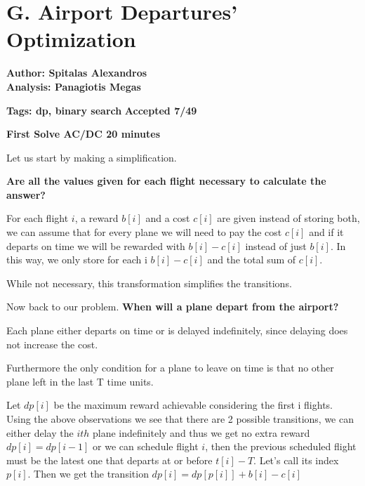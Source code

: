 \documentclass{article}
\begin{document}
    \vspace{5em}

    \newpage
    \vspace{5em}
    
\section*{G. Airport Departures' Optimization}

\textbf{Author: Spitalas Alexandros}\\
\textbf{Analysis: Panagiotis Megas}

\vspace{2em}
\noindent \textbf{Tags: dp, binary search} 
\hfill \textbf{Accepted 7/49}

\hfill \textbf{First Solve AC/DC 20 minutes}

\vspace{2em}

\noindent Let us start by making a simplification.

\noindent \textbf{Are all the values given for each flight necessary to calculate the answer?}

\noindent For each flight $i$, a reward $b[i]$ and a cost $c[i]$ are given instead of storing both, we can assume that for every plane we will need to pay the cost $c[i]$ and if it departs on time we will be rewarded with $b[i]-c[i]$ instead of just $b[i]$. In this way, we only store for each i $b[i]-c[i]$ and the total sum of $c[i]$.

\vspace{1em}

\noindent While not necessary, this transformation simplifies the transitions.

\vspace{1em}

\noindent Now back to our problem. \textbf{When will a plane depart from the airport?}

\noindent Each plane either departs on time or is delayed indefinitely, since delaying does not increase the cost.


\noindent Furthermore the only condition for a plane to leave on time is that no other plane left in the last T time units.

\vspace{1em}

\noindent Let $dp[i]$ be the maximum reward achievable considering the first i flights. Using the above observations we see that there are 2 possible transitions, we can either delay the $ith$ plane indefinitely and thus we get no extra reward $dp[i] = dp[i-1]$ or we can schedule flight $i$, then the previous scheduled flight must be the latest one that departs at or before $t[i] - T$. Let’s call its index $p[i]$. Then we get the transition $dp[i] = dp[p[i]]+b[i]-c[i]$
\end{document}
